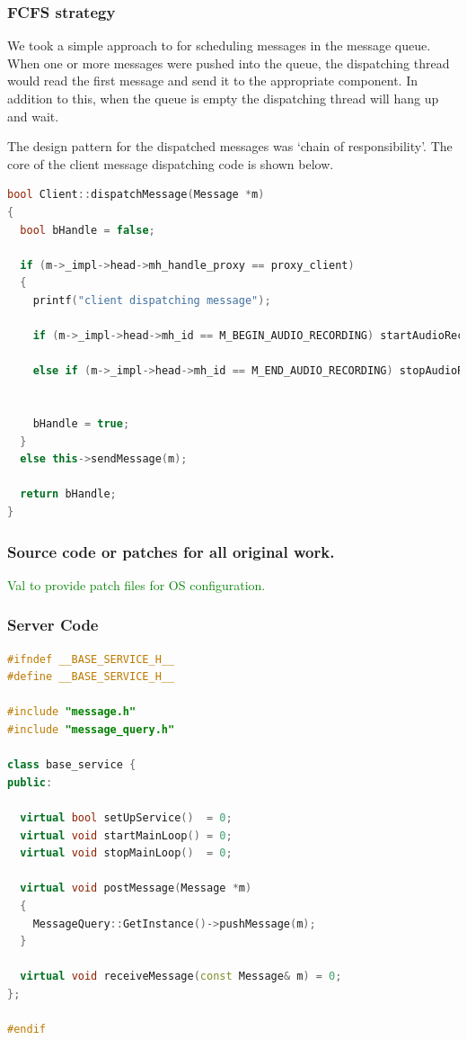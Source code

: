 \documentclass[11pt,a4paper,titlepage]{report}
\begin{document}
\subsubsection{FCFS strategy}

We took a simple approach to for scheduling messages in the message queue. When one or more messages were pushed into the queue, the dispatching thread would read the first message and send it to the appropriate component. In addition to this, when the queue is empty the dispatching thread will hang up and wait.

The design pattern for the dispatched messages was `chain of responsibility'. The core of the client message dispatching code is shown below.

\begin{lstlisting}[caption={Example of message dispatch},language=C++]
bool Client::dispatchMessage(Message *m)
{
  bool bHandle = false;

  if (m->_impl->head->mh_handle_proxy == proxy_client)
  {
    printf("client dispatching message");

    if (m->_impl->head->mh_id == M_BEGIN_AUDIO_RECORDING) startAudioRecording();

    else if (m->_impl->head->mh_id == M_END_AUDIO_RECORDING) stopAudioRecording();


    bHandle = true;
  }
  else this->sendMessage(m);

  return bHandle;
}
\end{lstlisting}







\subsubsection{Source code or patches for all original work.}


\textcolor{green}{Val to provide patch files for OS configuration.}


\subsubsection{Server Code}

\begin{lstlisting}[caption=basic-service.h,language=C++]
#ifndef __BASE_SERVICE_H__
#define __BASE_SERVICE_H__

#include "message.h"
#include "message_query.h"

class base_service {
public:

  virtual bool setUpService()  = 0;
  virtual void startMainLoop() = 0;
  virtual void stopMainLoop()  = 0;

  virtual void postMessage(Message *m)
  {
    MessageQuery::GetInstance()->pushMessage(m);
  }

  virtual void receiveMessage(const Message& m) = 0;
};

#endif
\end{lstlisting}
\end{document}

